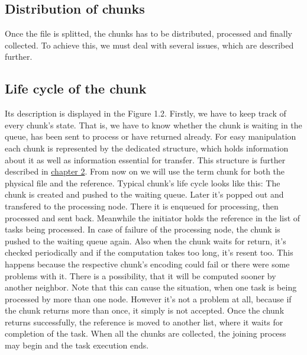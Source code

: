 \subsection{Distribution of chunks}\label{distribution-of-chunks}

Once the file is splitted, the chunks has to be distributed, processed
and finally collected. To achieve this, we must deal with several
issues, which are described further.

\subsection*{Life cycle of the chunk}

Its description is displayed in the Figure 1.2. Firstly, we have to keep
track of every chunk's state. That is, we have to know whether the chunk
is waiting in the queue, has been sent to process or have returned
already. For easy manipulation each chunk is represented by the
dedicated structure, which holds information about it as well as
information essential for transfer. This structure is further described
in \hyperref[implementation]{chapter 2}. From now on we will use the
term chunk for both the physical file and the reference. Typical chunk's
life cycle looks like this: The chunk is created and pushed to the
waiting queue. Later it's popped out and transfered to the processing
node. There it is enqueued for processing, then processed and sent back.
Meanwhile the initiator holds the reference in the list of tasks being
processed. In case of failure of the processing node, the chunk is
pushed to the waiting queue again. Also when the chunk waits for return,
it's checked periodically and if the computation takes too long, it's
resent too. This happens because the respective chunk's encoding could
fail or there were some problems with it. There is a possibility, that
it will be computed sooner by another neighbor. Note that this can cause
the situation, when one task is being processed by more than one node.
However it's not a problem at all, because if the chunk returns more
than once, it simply is not accepted. Once the chunk returns
successfully, the reference is moved to another list, where it waits for
completion of the task. When all the chunks are collected, the joining
process may begin and the task execution ends.

